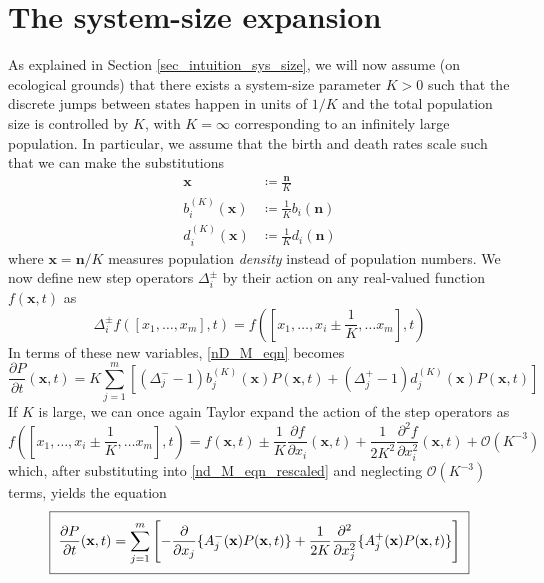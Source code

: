 \section{The system-size expansion}
As explained in Section \ref{sec_intuition_sys_size}, we will now assume (on ecological grounds) that there exists a system-size parameter $K > 0$ such that the discrete jumps between states happen in units of $1/K$ and the total population size is controlled by $K$, with $K = \infty$ corresponding to an infinitely large population. In particular, we assume that the birth and death rates scale such that we can make the substitutions
\begin{align*}
\mathbf{x} &\coloneqq \frac{\mathbf{n}}{K}\\
b^{(K)}_i(\mathbf{x}) &\coloneqq \frac{1}{K}b_i(\mathbf{n})\\
d^{(K)}_i(\mathbf{x}) &\coloneqq \frac{1}{K}d_i(\mathbf{n})
\end{align*}
where $\mathbf{x} = \mathbf{n}/K$ measures population \emph{density} instead of population numbers. We now define new step operators $\Delta_{i}^{\pm}$ by their action on any real-valued function $f(\mathbf{x},t)$ as
\begin{equation}
\label{nD_step_operators_rescaled}
\Delta_{i}^{\pm}f([x_1,\ldots,x_m],t) = f([x_1,\ldots,x_i \pm \frac{1}{K}, \ldots x_m],t)
\end{equation}
In terms of these new variables, \eqref{nD_M_eqn} becomes
\begin{equation}
\label{nd_M_eqn_rescaled}
\frac{\partial P}{\partial t}(\mathbf{x},t) = K\sum\limits_{j=1}^{m}\left[(\Delta_j^{-}-1)b^{(K)}_j(\mathbf{x})P(\mathbf{x},t) + (\Delta_j^{+}-1)d^{(K)}_j(\mathbf{x})P(\mathbf{x},t)\right]
\end{equation}
If $K$ is large, we can once again Taylor expand the action of the step operators as
\begin{equation*}
f([x_1,\ldots,x_i \pm \frac{1}{K}, \ldots x_m],t) = f(\mathbf{x},t) \pm \frac{1}{K}\frac{\partial f}{\partial x_i}(\mathbf{x},t) + \frac{1}{2K^2}\frac{\partial^2f}{\partial x_i^2}(\mathbf{x},t) + \mathcal{O}(K^{-3})
\end{equation*}
which, after substituting into \eqref{nd_M_eqn_rescaled} and neglecting $ \mathcal{O}(K^{-3})$ terms, yields the equation
\begin{equation}
\label{nD_FPE}
\setlength{\fboxsep}{2\fboxsep}\boxed{\frac{\partial P}{\partial t}(\mathbf{x},t) = \sum\limits_{j=1}^{m}\left[-\frac{\partial}{\partial x_j}\{A_j^{-}(\mathbf{x})P(\mathbf{x},t)\} + \frac{1}{2K}\frac{\partial^2}{\partial x_j^2}\{A_j^{+}(\mathbf{x})P(\mathbf{x},t)\}\right]}
\end{equation}
